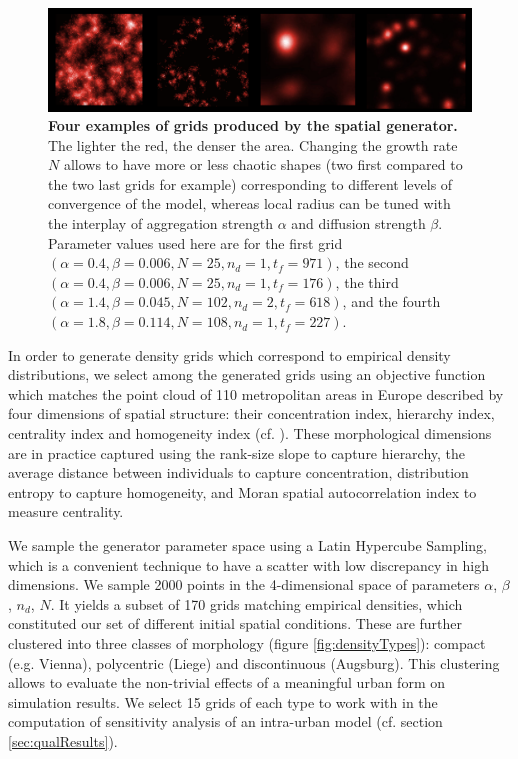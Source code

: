 \documentclass{JASSS}
\begin{document}
\begin{figure}[!t]
\centering
	\includegraphics[width=\textwidth]{figures/Fig2.png}
 \caption{\textbf{Four examples of grids produced by the spatial generator.} The lighter the red, the denser the area. Changing the growth rate $N$ allows to have more or less chaotic shapes (two first compared to the two last grids for example) corresponding to different levels of convergence of the model, whereas local radius can be tuned with the interplay of aggregation strength $\alpha$ and diffusion strength $\beta$. Parameter values used here are for the first grid $(\alpha = 0.4,\beta=0.006, N = 25, n_d = 1, t_f = 971)$, the second $(\alpha = 0.4,\beta=0.006, N = 25, n_d = 1, t_f = 176)$, the third $(\alpha = 1.4,\beta=0.045, N = 102, n_d = 2, t_f = 618)$, and the fourth $(\alpha = 1.8,\beta=0.114, N = 108, n_d = 1, t_f = 227)$.}
\label{fig:spatialGen}
\end{figure} %


In order to generate density grids which correspond to empirical density distributions, we select among the generated grids using an objective function which matches the point cloud of 110 metropolitan areas in Europe described by four dimensions of spatial structure: their concentration index, hierarchy index, centrality index and homogeneity index (cf. \cite{LeNechet2015}). These morphological dimensions are in practice captured using the rank-size slope to capture hierarchy, the average distance between individuals to capture concentration, distribution entropy to capture homogeneity, and Moran spatial autocorrelation index to measure centrality.

We sample the generator parameter space using a Latin Hypercube Sampling, which is a convenient technique to have a scatter with low discrepancy in high dimensions. We sample 2000 points in the 4-dimensional space of parameters {$\alpha$, $\beta$, $n_d$, $N$}. It yields a subset of 170 grids matching empirical densities, which constituted our set of different initial spatial conditions. These are further clustered into three classes of morphology (figure \ref{fig:densityTypes}): compact (e.g. Vienna), polycentric (Liege) and discontinuous (Augsburg). This clustering allows to evaluate the non-trivial effects of a meaningful urban form on simulation results. We select 15 grids of each type to work with in the computation of sensitivity analysis of an intra-urban model (cf. section \ref{sec:qualResults}).
\end{document}
